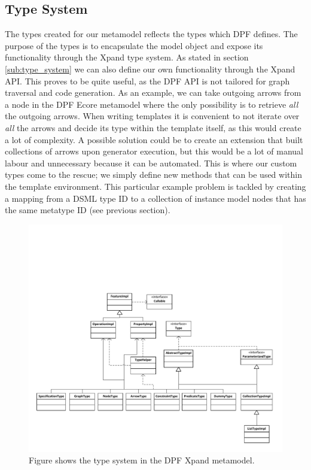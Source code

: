 \subsection{Type System}\label{subsec:type_system}
The types created for our metamodel reflects the types which DPF defines. The purpose of the types is to encapsulate the model object and expose its functionality through the Xpand type system. As stated in section \ref{sub:type_system} we can also define our own functionality through the Xpand API. This proves to be quite useful, as the DPF API is not tailored for graph traversal and code generation. As an example, we can take outgoing arrows from a node in the DPF Ecore metamodel where the only possibility is to retrieve \emph{all} the outgoing arrows. When writing templates it is convenient to not iterate over \emph{all} the arrows and decide its type within the template itself, as this would create a lot of complexity. A possible solution could be to create an extension that built collections of arrows upon generator execution, but this would be a lot of manual labour and unnecessary because it can be automated. This is where our custom types come to the rescue; we simply define new methods that can be used within the template environment. This particular example problem is tackled by creating a mapping from a DSML type ID to a collection of instance model nodes that has the same metatype ID (see previous section). 

\begin{figure}[htpb]
  \centering
  \centerline{\includegraphics[scale=0.8]{images/typeuml.pdf}}
  \caption[DPF Xpand types]{Figure shows the type system in the DPF Xpand metamodel.}
  \label{fig:xpand_dpf_types}
\end{figure}

